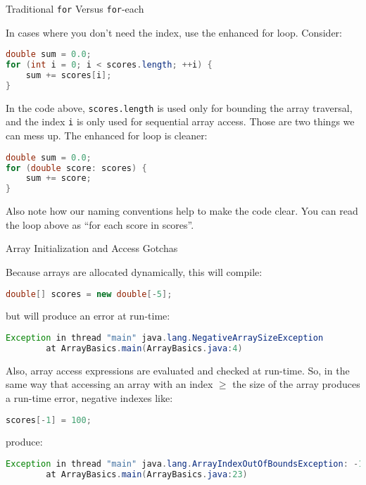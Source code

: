 \documentclass{beamer}
\begin{document}
\begin{frame}[fragile]{Traditional {\tt for} Versus {\tt for}-each}


In cases where you don't need the index, use the enhanced for loop.  Consider:
\vspace{-.05in}
\begin{lstlisting}[language=Java]
double sum = 0.0;
for (int i = 0; i < scores.length; ++i) {
    sum += scores[i];
}
\end{lstlisting}
\vspace{-.05in}
In the code above, {\tt scores.length} is used only for bounding the array traversal, and the index {\tt i} is only used for sequential array access.  Those are two things we can mess up.  The enhanced for loop is cleaner:

\begin{lstlisting}[language=Java]
double sum = 0.0;
for (double score: scores) {
    sum += score;
}
\end{lstlisting}

Also note how our naming conventions help to make the code clear.  You can read the loop above as ``for each score in scores''.

\end{frame}

\begin{frame}[fragile]{Array Initialization and Access Gotchas}


Because arrays are allocated dynamically, this will compile:
\begin{lstlisting}[language=Java]
double[] scores = new double[-5];
\end{lstlisting}
but will produce an error at run-time:
\begin{lstlisting}[language=Java]
Exception in thread "main" java.lang.NegativeArraySizeException
        at ArrayBasics.main(ArrayBasics.java:4)
\end{lstlisting}

Also, array access expressions are evaluated and checked at run-time.  So, in the same way that accessing an array with an index $\ge$ the size of the array produces a run-time error, negative indexes like:

\begin{lstlisting}[language=Java]
scores[-1] = 100;
\end{lstlisting}
produce:
\begin{lstlisting}[language=Java]
Exception in thread "main" java.lang.ArrayIndexOutOfBoundsException: -1
        at ArrayBasics.main(ArrayBasics.java:23)
\end{lstlisting}
\end{frame}
\end{document}
